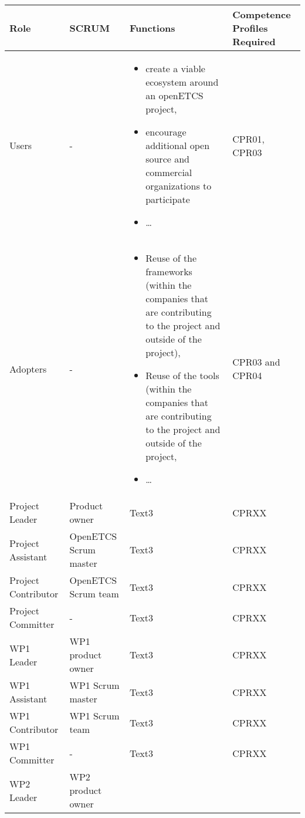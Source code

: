 \documentclass{template/openetcs_article}
\begin{document}
\begin{flushleft}
\tablefirsthead{}
\tablehead{}
\tabletail{}
\tablelasttail{}
\begin{supertabular}{|m{2cm}|m{2cm}|m{9cm}|m{2cm}|}
\hline
{}
Role &
SCRUM &
Functions &
Competence Profiles Required\\\hline
Users &
- &

\begin{itemize}
\item create a viable ecosystem around an openETCS project,
\item encourage additional open source and commercial organizations to participate
\item {\dots}
\end{itemize}
&CPR01, CPR03\\\hline
Adopters &
- &
\begin{itemize}
\item Reuse of the frameworks (within the companies that are contributing to the project and outside of the project),
\item Reuse of the tools (within the companies that are contributing to the project and outside of the project,
\item {\dots}
\end{itemize}

&
CPR03 and CPR04\\\hline

Project Leader &
Product owner &
Text3 &
CPRXX\\\hline
Project Assistant &
OpenETCS Scrum master &
Text3 &
CPRXX\\\hline
Project Contributor &
OpenETCS Scrum team & %
Text3 &
CPRXX\\\hline
Project Committer &
- &
Text3 &
CPRXX\\\hline
WP1 Leader &
WP1 product owner &
Text3
&
CPRXX\\\hline
WP1 Assistant &
WP1 Scrum master &
Text3 &
CPRXX\\\hline
WP1 Contributor &
WP1 Scrum team &
Text3 &
CPRXX\\\hline
WP1 Committer &
- &
Text3 &
CPRXX\\\hline
WP2 Leader &
WP2 product owner &


\end{supertabular}
\end{flushleft}
\end{document}
